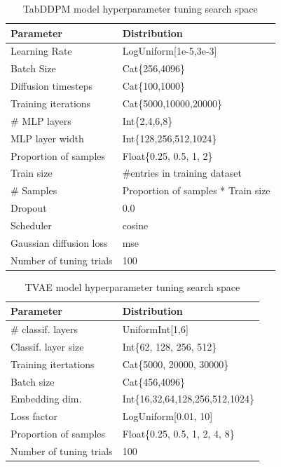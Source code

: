 \begin{table}[h]
	\centering
	\begin{tabular}{l | l }
		\toprule
		Parameter               & Distribution                       \\
		\midrule
		Learning Rate           & LogUniform[1e-5,3e-3]              \\
		Batch Size              & Cat\{256,4096\}                    \\
		Diffusion timesteps     & Cat\{100,1000\}                    \\
		Training iterations     & Cat\{5000,10000,20000\}            \\
		\# MLP layers           & Int\{2,4,6,8\}                     \\
		MLP layer width         & Int\{128,256,512,1024\}            \\
		Proportion of samples   & Float\{0.25, 0.5, 1, 2\}           \\
		\midrule
		Train size              & \#entries in training dataset      \\
		\# Samples              & Proportion of samples * Train size \\
		Dropout                 & 0.0                                \\
		Scheduler               & cosine                             \\
		Gaussian diffusion loss & mse                                \\
		\bottomrule
		Number of tuning trials & 100
	\end{tabular}
	\caption{TabDDPM model hyperparameter tuning search space}
	\label{tab:diff_tune}
\end{table}



\begin{table}[h]
	\centering
	\begin{tabular}{l | l }
		\hline
		Parameter               & Distribution                     \\
		\hline
		\# classif. layers      & UniformInt[1,6]                  \\
		Classif. layer size     & Int\{62, 128, 256, 512\}         \\
		Training itertations    & Cat\{5000, 20000, 30000\}        \\
		Batch size              & Cat\{456,4096\}                  \\
		Embedding dim.          & Int\{16,32,64,128,256,512,1024\} \\
		Loss factor             & LogUniform[0.01, 10]             \\
		Proportion of samples   & Float\{0.25, 0.5, 1, 2, 4, 8\}   \\
		\hline
		Number of tuning trials & 100
	\end{tabular}
	\caption{TVAE model hyperparameter tuning search space}
	\label{tab:tvae_tune}

\end{table}

